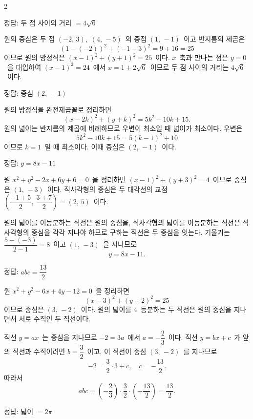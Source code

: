\documentclass[10pt,fleqn]{article}
\begin{document}
\dmsoltitlefirsttrue
\begin{multicols*}{2}

\begin{dmanswerbox}
정답: 두 점 사이의 거리 $=4\sqrt{6}$
\end{dmanswerbox}

원의 중심은 두 점 $(-2,\, 3)$,\ $(4,\, -5)$\ 의 중점 $(1,\, -1)$\ 이고 반지름의 제곱은
\[ (1-(-2))^2 + (-1-3)^2 = 9 + 16 = 25 \]
이므로 원의 방정식은 $(x-1)^2 + (y+1)^2 = 25$\ 이다. $x$\ 축과 만나는 점은 $y = 0$\ 을 대입하여 $(x-1)^2 = 24$\ 에서 $x = 1 \pm 2\sqrt{6}$\ 이므로 두 점 사이의 거리는 $4\sqrt{6}$\ 이다.
\begin{dmanswerbox}
정답: 중심 $(2,\, -1)$
\end{dmanswerbox}

원의 방정식을 완전제곱꼴로 정리하면
\[ (x-2k)^2 + (y+k)^2 = 5k^2 - 10k + 15. \] 원의 넓이는 반지름의 제곱에 비례하므로 우변이 최소일 때 넓이가 최소이다. 우변은
\[ 5k^2 - 10k + 15 = 5(k-1)^2 + 10 \]
이므로 $k = 1$\ 일 때 최소이다. 이때 중심은 $(2,\, -1)$\ 이다.
\begin{dmanswerbox}
정답: $y=8x-11$
\end{dmanswerbox}

원 $x^2 + y^2 - 2x + 6y + 6 = 0$\ 을 정리하면 $(x-1)^2 + (y+3)^2 = 4$\ 이므로 중심은 $(1,\, -3)$\ 이다. 직사각형의 중심은 두 대각선의 교점 $\left( \dfrac{-1+5}{2},\ \dfrac{3+7}{2} \right) = (2,\, 5)$\ 이다.

원의 넓이를 이등분하는 직선은 원의 중심을, 직사각형의 넓이를 이등분하는 직선은 직사각형의 중심을 각각 지나야 하므로 구하는 직선은 두 중심을 잇는다. 기울기는 $\dfrac{5-(-3)}{2-1} = 8$\ 이고 $(1,\, -3)$\ 을 지나므로
\[ y = 8x - 11. \]
\begin{dmanswerbox}
정답: $abc=\dfrac{13}{2}$
\end{dmanswerbox}

원 $x^2 + y^2 - 6x + 4y - 12 = 0$\ 을 정리하면
\[ (x-3)^2 + (y+2)^2 = 25 \]
이므로 중심은 $(3,\, -2)$\ 이다. 원의 넓이를 $4$\ 등분하는 두 직선은 원의 중심을 지나면서 서로 수직인 두 직선이다.

직선 $y = ax$\ 는 중심을 지나므로 $-2 = 3a$\ 에서 $a = -\dfrac{2}{3}$\ 이다. 직선 $y = bx + c$\ 가 앞의 직선과 수직이려면 $b = \dfrac{3}{2}$\ 이고, 이 직선이 중심 $(3,\, -2)$\ 를 지나므로
\[ -2 = \dfrac{3}{2} \cdot 3 + c,\quad c = -\dfrac{13}{2}. \]
따라서
\[ abc = \left( -\dfrac{2}{3} \right) \cdot \dfrac{3}{2} \cdot \left( -\dfrac{13}{2} \right) = \dfrac{13}{2}. \]
\begin{dmanswerbox}
정답: 넓이 $=2\pi$
\end{dmanswerbox}


\end{multicols*}
\end{document}
